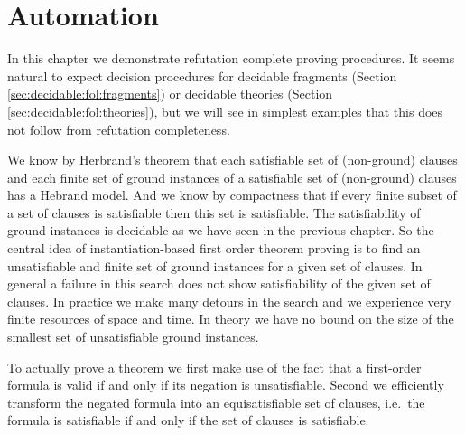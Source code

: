 
\chapter{Automation}



In this chapter we demonstrate refutation complete proving procedures.
It seems natural to expect decision procedures for decidable fragments 
(Section \ref{sec:decidable:fol:fragments})
or decidable theories (Section \ref{sec:decidable:fol:theories}),
but we will see in simplest examples that this does not follow 
from refutation completeness.


%
We know by Herbrand's theorem 
that each satisfiable set of (non-ground) clauses
and each finite set of ground instances of a satisfiable set of (non-ground) clauses
has a Hebrand model. 
And we know by compactness 
that if every finite subset of a set of clauses is satisfiable then this set is satisfiable.
The satisfiability of ground instances is decidable as we have seen in the previous chapter.
So the central idea of instantiation-based first order theorem proving 
is to find an unsatisfiable and finite set of ground instances for a given set of clauses.
In general a failure in this search does not show satisfiability of the given set of clauses.
In practice we make many detours in the search and we experience very finite resources of space and time. 
In theory we have no bound on the size of the smallest set of unsatisfiable ground instances.



To actually prove a theorem 
we first make use of the fact that a first-order formula is valid if and only if its negation is unsatisfiable.
Second we efficiently transform the negated formula into an {\myem equisatisfiable} set of clauses,
i.e.~the formula is satisfiable if and only if the set of clauses is satisfiable.

